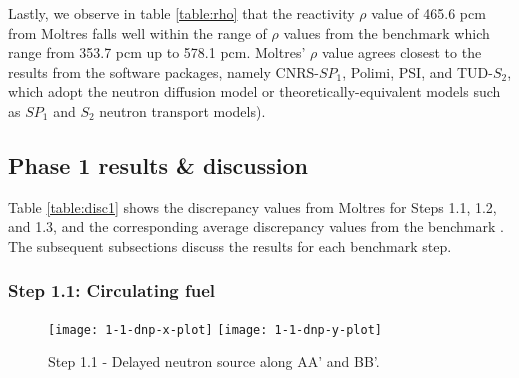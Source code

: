Lastly, we observe in table \ref{table:rho} that the reactivity $\rho$ value of
465.6 pcm from Moltres falls well within the range of $\rho$ values from the
benchmark which range from 353.7 pcm up to 578.1 pcm. Moltres' $\rho$ value
agrees closest to the results from the
software packages, namely CNRS-$SP_1$, Polimi, PSI, and TUD-$S_2$, which adopt
the neutron diffusion model or theoretically-equivalent models such as $SP_1$
and $S_2$ neutron transport models).

\subsection{Phase 1 results \& discussion}

Table \ref{table:disc1} shows the discrepancy values from Moltres for Steps
1.1, 1.2, and 1.3,
and the corresponding average discrepancy values from the benchmark
\citep{tiberga_results_2020}. The subsequent subsections discuss the results
for each benchmark step.

\subsubsection{Step 1.1: Circulating fuel}
%
\begin{figure*}[tb]
	\centering
    \texttt{[image: 1-1-dnp-x-plot]}
    \texttt{[image: 1-1-dnp-y-plot]}
	\caption{Step 1.1 - Delayed neutron source along AA' and BB'.}
	\label{fig:1.1}
\end{figure*}

